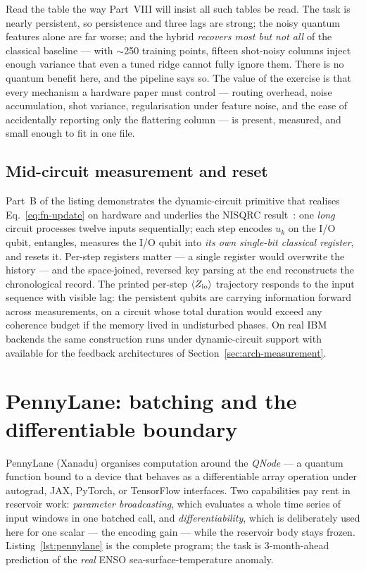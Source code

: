 Read the table the way Part~VIII will insist all such tables be read. The
task is nearly persistent, so persistence and three lags are strong; the
noisy quantum features alone are far worse; and the hybrid \emph{recovers
most but not all} of the classical baseline --- with $\sim$250 training
points, fifteen shot-noisy columns inject enough variance that even a tuned
ridge cannot fully ignore them. There is no quantum benefit here, and the
pipeline says so. The value of the exercise is that every mechanism a
hardware paper must control --- routing overhead, noise accumulation, shot
variance, regularisation under feature noise, and the ease of accidentally
reporting only the flattering column --- is present, measured, and small
enough to fit in one file.

\subsection{Mid-circuit measurement and reset}
\label{sec:midcircuit}

Part~B of the listing demonstrates the dynamic-circuit primitive that
realises Eq.~\eqref{eq:fn-update} on hardware and underlies the NISQRC
result~\citep{hu2024overcoming}: one \emph{long} circuit processes twelve
inputs sequentially; each step encodes $u_k$ on the I/O qubit, entangles,
measures the I/O qubit into \emph{its own single-bit classical register}, and
resets it. Per-step registers matter --- a single register would overwrite the
history --- and the space-joined, reversed key parsing at the end reconstructs
the chronological record. The printed per-step $\langle Z_{\mathrm{io}}\rangle$
trajectory responds to the input sequence with visible lag: the persistent
qubits are carrying information forward across measurements, on a circuit
whose total duration would exceed any coherence budget if the memory lived in
undisturbed phases. On real IBM backends the same construction runs under
dynamic-circuit support with  available for the feedback
architectures of Section~\ref{sec:arch-measurement}.

\section{PennyLane: batching and the differentiable boundary}
\label{sec:pennylane}

PennyLane (Xanadu) organises computation around the \emph{QNode} --- a quantum
function bound to a device that behaves as a differentiable array operation
under autograd, JAX, PyTorch, or TensorFlow interfaces. Two capabilities pay
rent in reservoir work: \emph{parameter broadcasting}, which evaluates a
whole time series of input windows in one batched call, and
\emph{differentiability}, which is deliberately used here for one scalar ---
the encoding gain --- while the reservoir body stays frozen.
Listing~\ref{lst:pennylane} is the complete program; the task is 3-month-ahead
prediction of the \emph{real} ENSO sea-surface-temperature anomaly.

